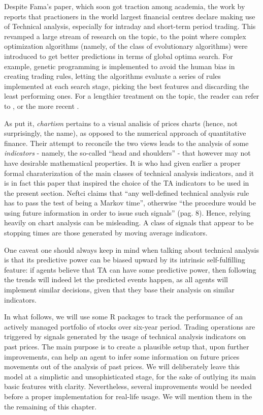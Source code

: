 \documentclass[
  11pt,
]{article}
\begin{document}
Despite Fama's paper, which soon got traction among academia, the work
by \citet{Taylor1992} reports that practioners in the world largest
financial centres declare making use of Technical analysis, especially
for intraday and short-term period trading. This revamped a large stream
of research on the topic, to the point where complex optimization
algorithms (namely, of the class of evolutionary algorithms) were
introduced to get better predictions in terms of global optima search.
For example, genetic programming is implemented to avoid the human bias
in creating trading rules, letting the algorithms evaluate a series of
rules implemented at each search stage, picking the best features and
discarding the least performing ones. For a lengthier treatment on the
topic, the reader can refer to \citet{Neely1997}, or the more recent
\citet{Mousavi2014} .

As \citet{Lo2000} put it, \emph{chartism} pertains to a visual analisis
of prices charts (hence, not surprisingly, the name), as opposed to the
numerical approach of quantitative finance. Their attempt to reconcile
the two views leads to the analysis of some \emph{indicators} - namely,
the so-called ``head and shoulders'' - that however may not have
desirable mathematical properties. It is \citet{Neftci1991} who had
given earlier a proper formal charaterization of the main classes of
technical analysis indicators, and it is in fact this paper that
inspired the choice of the TA indicators to be used in the present
section. Neftci claims that ``any well-defined technical analysis rule
has to pass the test of being a Markov time'', otherwise ``the procedure
would be using future information in order to issue such signals'' (pag.
8). Hence, relying heavily on chart analysis can be misleading. A class
of signals that appear to be stopping times are those generated by
moving average indicators.

One caveat one should always keep in mind when talking about technical
analysis is that its predictive power can be biased upward by its
intrinsic self-fulfilling feature: if agents believe that TA can have
some predictive power, then following the trends will indeed let the
predicted events happen, as all agents will implement similar decisions,
given that they base their analysis on similar indicators.

In what follows, we will use some R packages to track the performance of
an actively managed portfolio of stocks over six-year period. Trading
operations are triggered by signals generated by the usage of technical
analysis indicators on past prices. The main purpose is to create a
plausible setup that, upon further improvements, can help an agent to
infer some information on future prices movements out of the analysis of
past prices. We will deliberately leave this model at a simplistic and
unsophisticated stage, for the sake of outlying its main basic features
with clarity. Nevertheless, several improvements would be needed before
a proper implementation for real-life usage. We will mention them in the
the remaining of this chapter.
\end{document}
